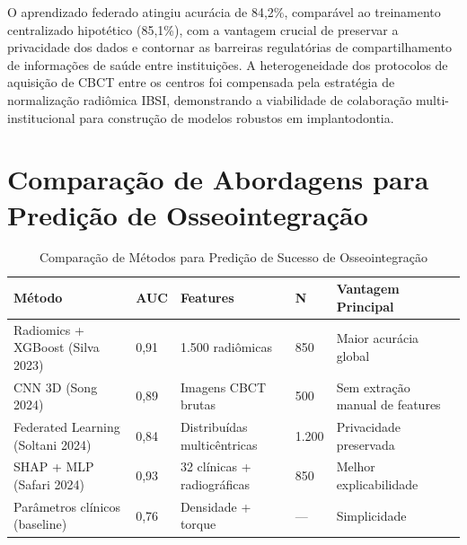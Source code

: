 
O aprendizado federado atingiu acurácia de 84,2\%, comparável ao treinamento centralizado hipotético (85,1\%), com a vantagem crucial de preservar a privacidade dos dados e contornar as barreiras regulatórias de compartilhamento de informações de saúde entre instituições. A heterogeneidade dos protocolos de aquisição de CBCT entre os centros foi compensada pela estratégia de normalização radiômica IBSI, demonstrando a viabilidade de colaboração multi-institucional para construção de modelos robustos em implantodontia.

\section{Comparação de Abordagens para Predição de Osseointegração}

\begin{table}[H]
\centering
\caption{Comparação de Métodos para Predição de Sucesso de Osseointegração}
\label{tab:osseointegration-methods}
\begin{tabular}{p{2.8cm}p{2cm}p{2cm}p{2.2cm}p{2.5cm}}
\toprule
\textbf{Método} & \textbf{AUC} & \textbf{Features} & \textbf{N} & \textbf{Vantagem Principal} \\
\midrule
Radiomics + XGBoost (Silva 2023) & 0,91 & 1.500 radiômicas & 850 & Maior acurácia global \\
CNN 3D (Song 2024) & 0,89 & Imagens CBCT brutas & 500 & Sem extração manual de features \\
Federated Learning (Soltani 2024) & 0,84 & Distribuídas multicêntricas & 1.200 & Privacidade preservada \\
SHAP + MLP (Safari 2024) & 0,93 & 32 clínicas + radiográficas & 850 & Melhor explicabilidade \\
Parâmetros clínicos (baseline) & 0,76 & Densidade + torque & --- & Simplicidade \\
\bottomrule
\end{tabular}
\end{table}

